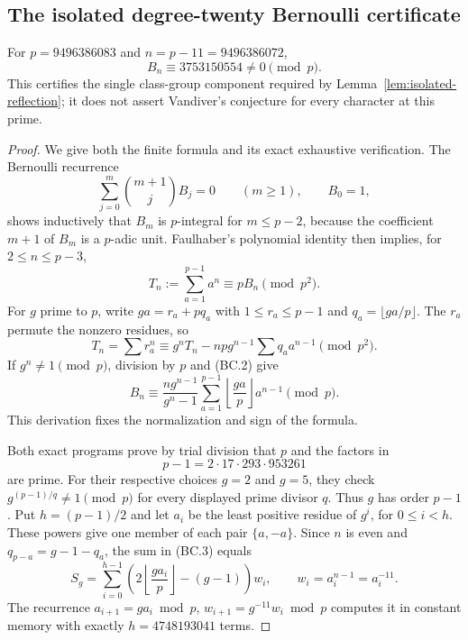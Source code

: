 \subsection{The isolated degree-twenty Bernoulli certificate}
\label{sec:bernoulli-residual-prime}

\begin{proposition}[K17-BERNOULLI-9496386083]
\label{prop:bernoulli-residual-prime}
\label{prop:bernoulli-residue}
For $p=9496386083$ and $n=p-11=9496386072$,
\[
                  B_n\equiv3753150554\ne0\pmod p.
 \tag{BC.1}
\]
This certifies the single class-group component required by
Lemma~\ref{lem:isolated-reflection}; it does not assert Vandiver's
conjecture for every character at this prime.
\end{proposition}

\begin{proof}
We give both the finite formula and its exact exhaustive verification.
The Bernoulli recurrence
\[
 \sum_{j=0}^{m}\binom{m+1}{j}B_j=0\qquad(m\ge1),\qquad B_0=1,
\]
shows inductively that $B_m$ is $p$-integral for $m\le p-2$,
because the coefficient $m+1$ of $B_m$ is a $p$-adic unit.
Faulhaber's polynomial identity then implies, for
$2\le n\le p-3$,
\[
                  T_n:=\sum_{a=1}^{p-1}a^n
                       \equiv pB_n\pmod{p^2}.
 \tag{BC.2}
\]
For $g$ prime to $p$, write $ga=r_a+pq_a$ with
$1\le r_a\le p-1$ and $q_a=\lfloor ga/p\rfloor$.
The $r_a$ permute the nonzero residues, so
\[
 T_n=\sum r_a^n
 \equiv g^nT_n-np g^{n-1}\sum q_a a^{n-1}\pmod{p^2}.
\]
If $g^n\ne1\pmod p$, division by $p$ and (BC.2) give
\[
 B_n\equiv
 \frac{n g^{n-1}}{g^n-1}
 \sum_{a=1}^{p-1}\left\lfloor\frac{ga}{p}\right\rfloor a^{n-1}
 \pmod p.
 \tag{BC.3}
\]
This derivation fixes the normalization and sign of the formula.

Both exact programs prove by trial division that $p$ and the factors in
\[
                     p-1=2\cdot17\cdot293\cdot953261
\]
are prime. For their respective choices $g=2$ and $g=5$, they check
$g^{(p-1)/q}\ne1\pmod p$ for every displayed prime divisor $q$.
Thus $g$ has order $p-1$. Put $h=(p-1)/2$ and let
$a_i$ be the least positive residue of $g^i$, for $0\le i<h$.
These powers give one member of each pair $\{a,-a\}$.
Since $n$ is even and
$q_{p-a}=g-1-q_a$, the sum in (BC.3) equals
\[
 S_g=\sum_{i=0}^{h-1}
       \left(2\left\lfloor\frac{ga_i}{p}\right\rfloor-(g-1)\right)w_i,
 \qquad w_i=a_i^{n-1}=a_i^{-11}.
 \tag{BC.4}
\]
The recurrence
$a_{i+1}=ga_i\bmod p$,
$w_{i+1}=g^{-11}w_i\bmod p$
computes it in constant memory with exactly
$h=4748193041$ terms.


\end{proof}
